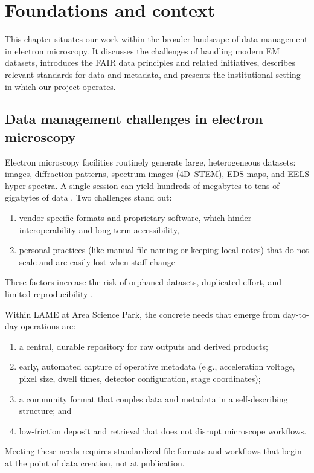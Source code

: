 \chapter{Foundations and context}
\label{chap:foundations}

This chapter situates our work within the broader landscape of data management in electron microscopy. 
It discusses the challenges of handling modern EM datasets, introduces the FAIR data principles and related initiatives, describes relevant standards for data and metadata, and presents the institutional setting in which our project operates.

\section{Data management challenges in electron microscopy}

Electron microscopy facilities routinely generate large, heterogeneous datasets: images, diffraction patterns, spectrum images (4D--STEM), EDS maps, and EELS hyper-spectra. 
A single session can yield hundreds of megabytes to tens of gigabytes of data \parencite{Poger2023BigDataEM}. 
Two challenges stand out: 

\begin{enumerate}
	\item vendor-specific formats and proprietary software, which hinder interoperability and long-term accessibility,
	\item personal practices (like manual file naming or keeping local notes) that do not scale and are easily lost when staff change \parencite{Moore2021OMENGFF,Korir2024TenRecs}
\end{enumerate}

These factors increase the risk of orphaned datasets, duplicated effort, and limited reproducibility \parencite{Poger2023BigDataEM,Korir2024TenRecs}.

Within LAME at Area Science Park, the concrete needs that emerge from day-to-day operations are:
\begin{enumerate}[label=(\alph*)]
	\item a central, durable repository for raw outputs and derived products;
	\item early, automated capture of operative metadata (e.g., acceleration voltage, pixel size, dwell times, detector configuration, stage coordinates);
	\item a community format that couples data and metadata in a self-describing structure; and
	\item low-friction deposit and retrieval that does not disrupt microscope workflows.
\end{enumerate}
Meeting these needs requires standardized file formats and workflows that begin at the point of data creation, not at publication.

